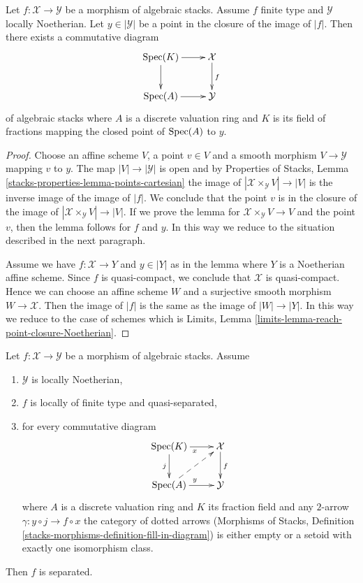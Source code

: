 \begin{lemma}
\label{lemma-reach-point-closure-Noetherian}
Let $f : \mathcal{X} \to \mathcal{Y}$ be a morphism of algebraic stacks.
Assume $f$ finite type and $\mathcal{Y}$ locally Noetherian.
Let $y \in |\mathcal{Y}|$ be a point in the closure of the image of $|f|$.
Then there exists a commutative diagram
$$
\xymatrix{
\Spec(K) \ar[r] \ar[d] & \mathcal{X} \ar[d]^f \\
\Spec(A) \ar[r] & \mathcal{Y}
}
$$
of algebraic stacks where $A$ is a discrete valuation ring and $K$
is its field of fractions mapping the closed point of $\mathop{\mathrm{Spec}}(A)$ to $y$.
\end{lemma}

\begin{proof}
Choose an affine scheme $V$, a point $v \in V$ and a smooth morphism
$V \to \mathcal{Y}$ mapping $v$ to $y$. The map $|V| \to |\mathcal{Y}|$
is open and by
Properties of Stacks, Lemma \ref{stacks-properties-lemma-points-cartesian}
the image of $|\mathcal{X} \times_\mathcal{Y} V| \to |V|$
is the inverse image of the image of $|f|$.
We conclude that the point $v$ is in the closure of the
image of $|\mathcal{X} \times_\mathcal{Y} V| \to |V|$.
If we prove the lemma for
$\mathcal{X} \times_\mathcal{Y} V \to V$ and the point $v$, then
the lemma follows for $f$ and $y$.
In this way we reduce to the situation described in the
next paragraph.

\medskip\noindent
Assume we have $f : \mathcal{X} \to Y$ and $y \in |Y|$ as in the lemma where
$Y$ is a Noetherian affine scheme. Since $f$ is quasi-compact, we conclude that
$\mathcal{X}$ is quasi-compact. Hence we can choose an affine scheme $W$ and
a surjective smooth morphism $W \to \mathcal{X}$. Then the image of
$|f|$ is the same as the image of $|W| \to |Y|$. In this way we reduce
to the case of schemes which is
Limits, Lemma \ref{limits-lemma-reach-point-closure-Noetherian}.
\end{proof}

\begin{lemma}
\label{lemma-check-separated-dvr}
Let $f : \mathcal{X} \to \mathcal{Y}$ be a morphism of algebraic stacks. Assume
\begin{enumerate}
\item $\mathcal{Y}$ is locally Noetherian,
\item $f$ is locally of finite type and quasi-separated,
\item for every commutative diagram
$$
\xymatrix{
\Spec(K) \ar[r]_x \ar[d]_j & \mathcal{X} \ar[d]^f \\
\Spec(A) \ar[r]^y \ar@{-->}[ru] & \mathcal{Y}
}
$$
where $A$ is a discrete valuation ring and $K$ its fraction field
and any $2$-arrow $\gamma : y \circ j \to f \circ x$ the category
of dotted arrows (Morphisms of Stacks, Definition
\ref{stacks-morphisms-definition-fill-in-diagram})
is either empty or a setoid with exactly one isomorphism class.
\end{enumerate}
Then $f$ is separated.
\end{lemma}

